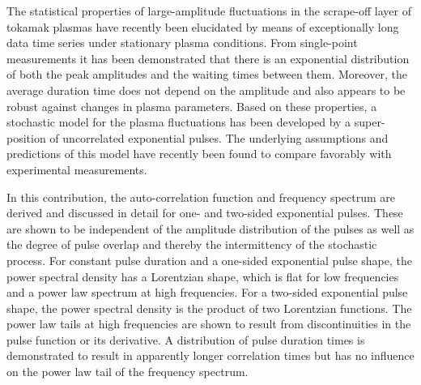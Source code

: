 \documentclass[aps,prb,12pt,a4paper,preprint,amsmath,amssymb,groupedaddress]{revtex4-1}
\begin{document}
The statistical properties of large-amplitude fluctuations in the scrape-off layer of tokamak plasmas have recently been elucidated by means of exceptionally long data time series under stationary plasma conditions.\cite{garcia-jnm,garcia-aps,garcia-nfl,theodorsen-ppcf,kube-ppcf,garcia-nme,theodorsen-nfl} From single-point measurements it has been demonstrated that there is an exponential distribution of both the peak amplitudes and the waiting times between them. Moreover, the average duration time does not depend on the amplitude and also appears to be robust against changes in plasma parameters.\cite{garcia-jnm-tcv,garcia-nf-tcv,garcia-ppcf-tcv2,garcia-jnm,garcia-aps,garcia-nfl,theodorsen-ppcf,kube-ppcf,garcia-nme,theodorsen-nfl} Based on these properties, a stochastic model for the plasma fluctuations has been developed by a super-position of uncorrelated exponential pulses.\cite{garcia-prl,garcia-php,theodorsen-php,kube-php,theodorsen-ps,garcia-phpl} The underlying assumptions and predictions of this model have recently been found to compare favorably with experimental measurements.\cite{garcia-jnm,garcia-aps,garcia-nfl,theodorsen-ppcf,kube-ppcf,garcia-nme,theodorsen-nfl}


In this contribution, the auto-correlation function and frequency spectrum are derived and discussed in detail for one- and two-sided exponential pulses. These are shown to be independent of the amplitude distribution of the pulses as well as the degree of pulse overlap and thereby the intermittency of the stochastic process. For constant pulse duration and a one-sided exponential pulse shape, the power spectral density has a Lorentzian shape, which is flat for low frequencies and a power law spectrum at high frequencies. For a two-sided exponential pulse shape, the power spectral density is the product of two Lorentzian functions. The power law tails at high frequencies are shown to result from discontinuities in the pulse function or its derivative. A distribution of pulse duration times is demonstrated to result in apparently longer correlation times but has no influence on the power law tail of the frequency spectrum.
\end{document}
